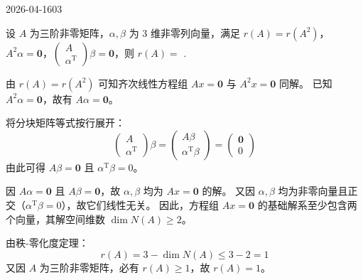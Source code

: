 \begin{mistake}{2026-04-16}{03}

\begin{problemcontent}
设 \(A\) 为三阶非零矩阵，\(\alpha,\beta\) 为 3 维非零列向量，满足 \(r(A) = r(A^2)\)，\(A^2\alpha = \mathbf{0}\)，\(\begin{pmatrix} A \\ \alpha^{\mathrm{T}} \end{pmatrix}\beta = \mathbf{0}\)，则 \(r(A) =\) \underline{\qquad\qquad}.
\end{problemcontent}

\begin{solutioncontent}
由 \(r(A) = r(A^2)\) 可知齐次线性方程组 \(Ax = \mathbf{0}\) 与 \(A^2x = \mathbf{0}\) 同解。
已知 \(A^2\alpha = \mathbf{0}\)，故有 \(A\alpha = \mathbf{0}\)。

将分块矩阵等式按行展开：
\[
\begin{pmatrix} A \\ \alpha^{\mathrm{T}} \end{pmatrix}\beta = \begin{pmatrix} A\beta \\ \alpha^{\mathrm{T}}\beta \end{pmatrix} = \begin{pmatrix} \mathbf{0} \\ 0 \end{pmatrix}
\]
由此可得 \(A\beta = \mathbf{0}\) 且 \(\alpha^{\mathrm{T}}\beta = 0\)。

因 \(A\alpha = \mathbf{0}\) 且 \(A\beta = \mathbf{0}\)，故 \(\alpha, \beta\) 均为 \(Ax = \mathbf{0}\) 的解。
又因 \(\alpha, \beta\) 均为非零向量且正交（\(\alpha^{\mathrm{T}}\beta = 0\)），故它们线性无关。
因此，方程组 \(Ax = \mathbf{0}\) 的基础解系至少包含两个向量，其解空间维数 \(\dim N(A) \ge 2\)。

由秩-零化度定理：
\[
r(A) = 3 - \dim N(A) \le 3 - 2 = 1
\]
又因 \(A\) 为三阶非零矩阵，必有 \(r(A) \ge 1\)，故 \(r(A) = 1\)。
\end{solutioncontent}


\end{mistake}
